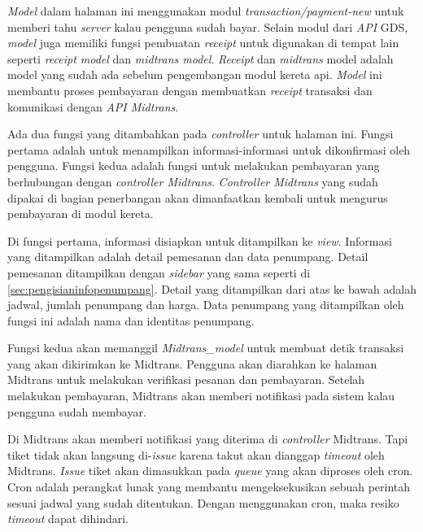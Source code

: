 \textit{Model} dalam halaman ini menggunakan modul \textit{transaction/payment-new} untuk memberi tahu \textit{server} kalau pengguna sudah bayar. Selain modul dari \textit{API} GDS, \textit{model} juga memiliki fungsi pembuatan \textit{receipt} untuk digunakan di tempat lain seperti \textit{receipt model} dan \textit{midtrans model}. \textit{Receipt} dan \textit{midtrans} model adalah model yang sudah ada sebelum pengembangan modul kereta api. \textit{Model} ini membantu proses pembayaran dengan membuatkan \textit{receipt} transaksi dan komunikasi dengan \textit{API Midtrans}.

Ada dua fungsi yang ditambahkan pada \textit{controller} untuk halaman ini. Fungsi pertama adalah untuk menampilkan informasi-informasi untuk dikonfirmasi oleh pengguna. Fungsi kedua adalah fungsi untuk melakukan pembayaran yang berhubungan dengan \textit{controller Midtrans}. \textit{Controller Midtrans} yang sudah dipakai di bagian penerbangan akan dimanfaatkan kembali untuk mengurus pembayaran di modul kereta.

Di fungsi pertama, informasi disiapkan untuk ditampilkan ke \textit{view}. Informasi yang ditampilkan adalah detail pemesanan dan data penumpang. Detail pemesanan ditampilkan dengan \textit{sidebar} yang sama seperti di \ref{sec:pengisianinfopenumpang}. Detail yang ditampilkan dari atas ke bawah adalah jadwal, jumlah penumpang dan harga. Data penumpang yang ditampilkan oleh fungsi ini adalah nama dan identitas penumpang.

Fungsi kedua akan memanggil \textit{Midtrans\_model} untuk membuat detik transaksi yang akan dikirimkan ke Midtrans. Pengguna akan diarahkan ke halaman Midtrans untuk melakukan verifikasi pesanan dan pembayaran. Setelah melakukan pembayaran, Midtrans akan memberi notifikasi pada sistem kalau pengguna sudah membayar.

Di Midtrans akan memberi notifikasi yang diterima di \textit{controller} Midtrans. Tapi tiket tidak akan langsung di-\textit{issue} karena takut akan dianggap \textit{timeout} oleh Midtrans. \textit{Issue} tiket akan dimasukkan pada \textit{queue} yang akan diproses oleh cron. Cron adalah perangkat lunak yang membantu mengeksekusikan sebuah perintah sesuai jadwal yang sudah ditentukan. Dengan menggunakan cron, maka resiko \textit{timeout} dapat dihindari.